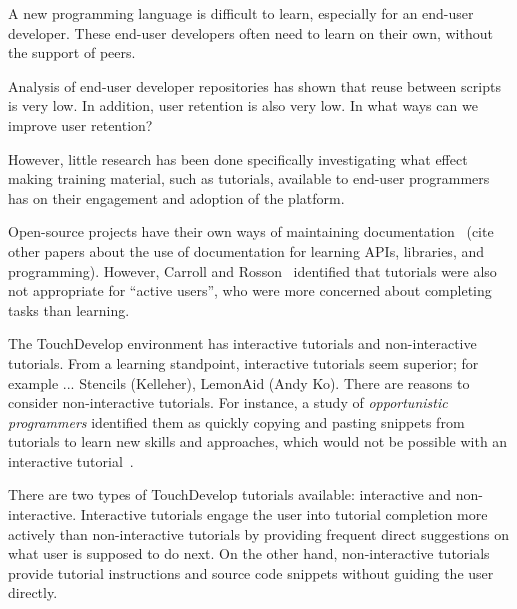  A new programming language is difficult to learn, especially for an end-user developer. These end-user developers often need to learn on their own, without the support of peers.

Analysis of end-user developer repositories
\cite{athreya2012:touchdevelop,bogart2008:coscripter,sihan2013:touchdevelop,stolee2013:yahoopipes} has shown that reuse between scripts is very low. In addition, user retention is also very low. In what ways can we improve user retention? 

However, little research has been done specifically investigating what effect making training material, such as tutorials, available to end-user programmers has on their engagement and adoption of the platform.

Open-source projects have their own ways of maintaining documentation~\cite{dagenais2010} (cite other papers about the use of documentation for learning APIs, libraries, and programming). However, Carroll and Rosson~\cite{carroll_paradox_1987} identified that tutorials were also not appropriate for ``active users'', who were more concerned about completing tasks than learning.

The TouchDevelop environment has interactive tutorials and non-interactive tutorials. From a learning standpoint, interactive tutorials seem superior; for example ... Stencils (Kelleher), LemonAid (Andy Ko). There are reasons to consider non-interactive tutorials. For instance, a study of \emph{opportunistic programmers} identified them as quickly copying and pasting snippets from tutorials to learn new skills and approaches, which would not be possible with an interactive tutorial~\cite{brandt2009:opportunistic}.



There are two types of TouchDevelop tutorials available: interactive and non-interactive. Interactive tutorials engage the user into tutorial completion more actively than non-interactive tutorials by providing frequent direct suggestions on what user is supposed to do next. On the other hand, non-interactive tutorials provide tutorial instructions and source code snippets without guiding the user directly.
